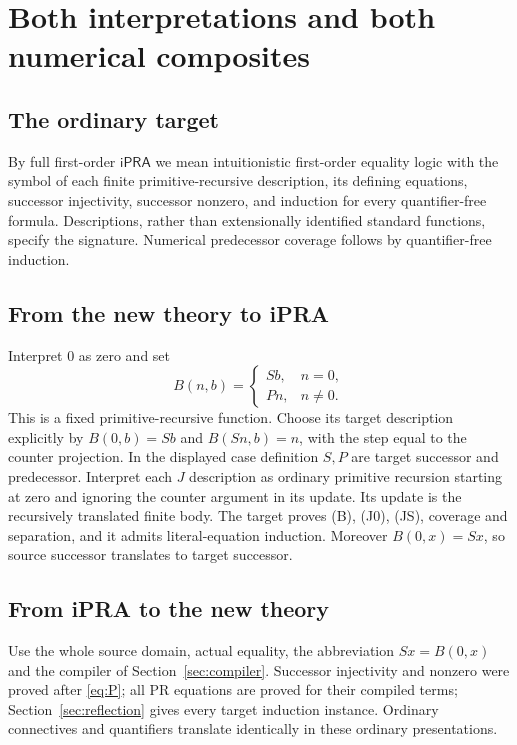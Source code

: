 \documentclass[11pt]{article}
\theoremstyle{definition}
\newcommand{\ipra}{\mathsf{iPRA}}
\begin{document}
\section{Both interpretations and both numerical composites}
\label{sec:biinterpretation}

\subsection{The ordinary target}

By full first-order $\ipra$ we mean intuitionistic first-order equality
logic with the symbol of each finite primitive-recursive description,
its defining equations, successor injectivity, successor nonzero, and
induction for every quantifier-free formula. Descriptions, rather than
extensionally identified standard functions, specify the signature.
Numerical predecessor coverage follows by quantifier-free induction.

\subsection{From the new theory to iPRA}

Interpret $0$ as zero and set
\begin{equation}
 B(n,b)=
 \begin{cases}
 Sb,&n=0,\\
 Pn,&n\ne0.
 \end{cases}
 \label{eq:Btarget}
\end{equation}
This is a fixed primitive-recursive function. Choose its target description
explicitly by $B(0,b)=Sb$ and $B(Sn,b)=n$, with the step equal to
the counter projection. In the displayed case definition $S,P$ are
target successor and predecessor. Interpret each $J$ description
as ordinary primitive recursion starting at zero and ignoring the
counter argument in its update. Its update is the recursively translated
finite body. The target proves (B), (J0), (JS), coverage and separation,
and it admits literal-equation induction. Moreover $B(0,x)=Sx$, so
source successor translates to target successor.

\subsection{From iPRA to the new theory}

Use the whole source domain, actual equality, the abbreviation $Sx=B(0,x)$
and the compiler of Section~\ref{sec:compiler}. Successor injectivity
and nonzero were proved after \eqref{eq:P}; all PR equations are proved
for their compiled terms; Section~\ref{sec:reflection} gives every
target induction instance. Ordinary connectives and quantifiers translate
identically in these ordinary presentations.
\end{document}
